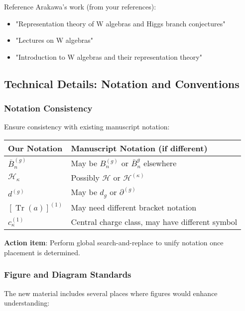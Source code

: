 Reference Arakawa's work (from your references):
\begin{itemize}
\item "Representation theory of W algebras and Higgs branch conjectures"
\item "Lectures on W algebras"  
\item "Introduction to W algebras and their representation theory"
\end{itemize}

\subsection{Technical Details: Notation and Conventions}

\subsubsection{Notation Consistency}

Ensure consistency with existing manuscript notation:

\begin{center}
\begin{tabular}{ll}
\textbf{Our Notation} & \textbf{Manuscript Notation (if different)}\\
\hline
$\bar{B}^{(g)}_n$ & May be $B^{(g)}_n$ or $\bar{B}_n^g$ elsewhere\\
$\mathcal{H}_\kappa$ & Possibly $\mathcal{H}$ or $\mathcal{H}^{(\kappa)}$\\
$d^{(g)}$ & May be $d_g$ or $\partial^{(g)}$\\
$[\operatorname{Tr}(a)]^{(1)}$ & May need different bracket notation\\
$c_\kappa^{(1)}$ & Central charge class, may have different symbol\\
\end{tabular}
\end{center}

\textbf{Action item}: Perform global search-and-replace to unify notation once placement is determined.

\subsubsection{Figure and Diagram Standards}

The new material includes several places where figures would enhance understanding:

